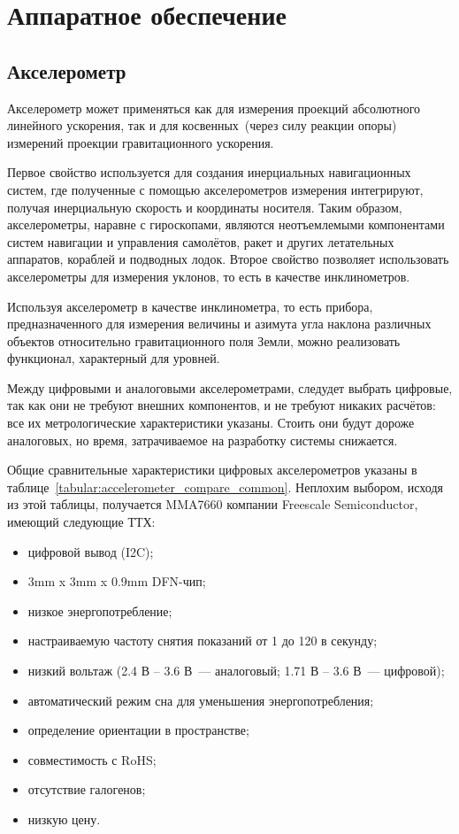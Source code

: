 \documentclass[document.tex]{subfiles}
\begin{document}
\section{Аппаратное обеспечение}
\subsection{Акселерометр}
Акселерометр может применяться как для измерения проекций абсолютного линейного
ускорения, так и для косвенных~(через силу реакции опоры) измерений проекции
гравитаци\-онного ускорения.

Первое свойство используется для создания инерциальных навигационных систем, где
полученные с помощью акселерометров измерения интегрируют, получая
инерци\-альную ско\-рость и координаты носителя. Таким образом, акселерометры, наравне с
гироско\-пами, являются неотъемлемыми компонентами систем навигации и управления
самолётов, ракет и других летательных аппаратов, кораблей и подводных лодок.
Второе свойство позволяет использовать акселерометры для измерения уклонов, то
есть в качестве инклино\-метров.\cite{accelerometer_info}

Используя акселерометр в качестве инклинометра, то есть прибора,
предназначенного для измерения величины и азимута угла наклона различных
объектов относительно гравита\-ционного поля Земли, можно реализовать функционал,
характерный для уровней.

Между цифровыми и аналоговыми акселерометрами, следудет выбрать цифровые, так
как они не требуют внешних компонентов, и не требуют никаких расчётов: все их
метро\-логические характеристики указаны. Стоить они будут дороже аналоговых, но
время, затра\-чиваемое на разработку системы
снижается.\cite{accelerometer_compare}

Общие сравнительные характеристики цифровых акселерометров указаны в таблице~\ref{tabular:accelerometer_compare_common}.
Неплохим выбором, исходя из этой таблицы, получается MMA7660 компании Freescale Semiconductor, имеющий следующие ТТХ:
\begin{itemize}
	\item цифровой вывод (I2C);
	\item 3mm x 3mm x 0.9mm DFN-чип; 
	\item низкое энергопотребление;
	\item настраиваемую частоту снятия показаний от 1 до 120 в секунду;
	\item низкий вольтаж (2.4 В -- 3.6 В~--- аналоговый; 1.71 В -- 3.6 В~--- цифровой);
	\item автоматический режим сна для уменьшения энергопотребления;
	\item определение ориентации в пространстве;
	\item совместимость с RoHS;
	\item отсутствие галогенов;
	\item низкую цену.
\end{itemize}
\end{document}
